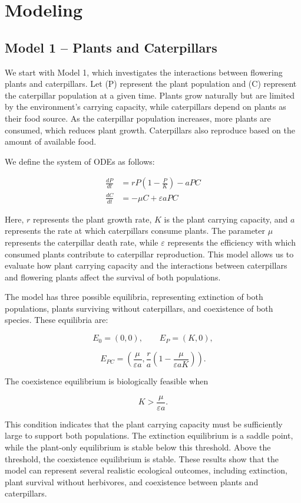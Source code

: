 \documentclass[11pt]{amsart}
\begin{document}
\section{Modeling}

\subsection{Model 1 -- Plants and Caterpillars}

We start with Model 1, which investigates the interactions between flowering plants and caterpillars. Let (P) represent the plant population and (C) represent the caterpillar population at a given time. Plants grow naturally but are limited by the environment's carrying capacity, while caterpillars depend on plants as their food source. As the caterpillar population increases, more plants are consumed, which reduces plant growth. Caterpillars also reproduce based on the amount of available food.

We define the system of ODEs as follows:

\[
\begin{aligned}
\frac{dP}{dt} &= r P\left(1-\frac{P}{K}\right)-aPC \\[6pt]
\frac{dC}{dt} &= -\mu C+\varepsilon aPC
\end{aligned}
\]

Here, $r$ represents the plant growth rate, $K$ is the plant carrying capacity, and $a$ represents the rate at which caterpillars consume plants. The parameter $\mu$ represents the caterpillar death rate, while $\varepsilon$ represents the efficiency with which consumed plants contribute to caterpillar reproduction. This model allows us to evaluate how plant carrying capacity and the interactions between caterpillars and flowering plants affect the survival of both populations.

The model has three possible equilibria, representing extinction of both populations, plants surviving without caterpillars, and coexistence of both species. These equilibria are:

\[
E_0=(0,0), \qquad E_P=(K,0),
\]

\[
E_{PC}=
\left(
\frac{\mu}{\varepsilon a},
\frac{r}{a}\left(1-\frac{\mu}{\varepsilon aK}\right)
\right).
\]

The coexistence equilibrium is biologically feasible when

\[
K>\frac{\mu}{\varepsilon a}.
\]

This condition indicates that the plant carrying capacity must be sufficiently large to support both populations. The extinction equilibrium is a saddle point, while the plant-only equilibrium is stable below this threshold. Above the threshold, the coexistence equilibrium is stable. These results show that the model can represent several realistic ecological outcomes, including extinction, plant survival without herbivores, and coexistence between plants and caterpillars.
\end{document}

